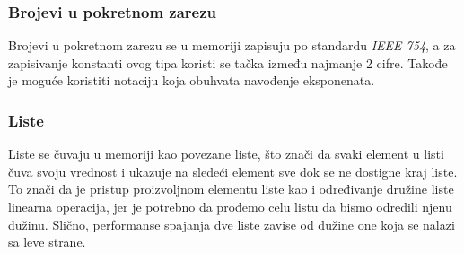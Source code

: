 \documentclass[12pt,oneside]{memoir}
\begin{document}
\subsubsection{Brojevi u pokretnom zarezu}
Brojevi u pokretnom zarezu se u memoriji zapisuju po standardu \textit{IEEE 754}, a za zapisivanje konstanti ovog tipa koristi se tačka između najmanje 2 cifre. Takođe je moguće koristiti notaciju koja obuhvata navođenje eksponenata.\\

\begin{comment}
\subsubsection{Procesi}
U Elixir-u se sav kod pokreće unutar procesa. Procesi su izolovani jedni od drugih, spajaju se jedan sa drugima i komuniciraju putem slanja poruka. Procesi nisu samo osnova za konkurentnost u Elixir-u, već i sredstva za izgradnju distribuiranih i tolerantnih programa.
Procese Elixir-a ne treba mešati sa procesima operativnog sistema. Procesi Elixira su izuzetno lagani u smislu memorije i CPU-a (čak i u poređenju sa nitima koji se koriste u mnogim drugim programskim jezicima). Zbog toga nije neuobičajeno da se istovremeno odvijaju desetine ili čak stotine hiljada procesa.\\
\end{comment}

\begin{comment}
\subsubsection{Portovi i reference}
Portovi ukazuju na spoljne resurse koje omogućavaju interakciju sa spoljnim svetom.\\

Reference su jedinstvene vrednosti u globalnom kontekstu izvršavanja programa koje se kreiraju pozivom \textit{make\_ref} funkcije.\\
\end{comment}

\subsubsection{Liste}
Liste se čuvaju u memoriji kao povezane liste, što znači da svaki element u listi čuva svoju vrednost i ukazuje na sledeći element sve dok se ne dostigne kraj liste. To znači da je pristup proizvoljnom elementu liste kao i određivanje družine liste linearna operacija, jer je potrebno da prođemo celu listu da bismo odredili njenu dužinu. Slično, performanse spajanja dve liste zavise od dužine one koja se nalazi sa leve strane. 
\end{document}
